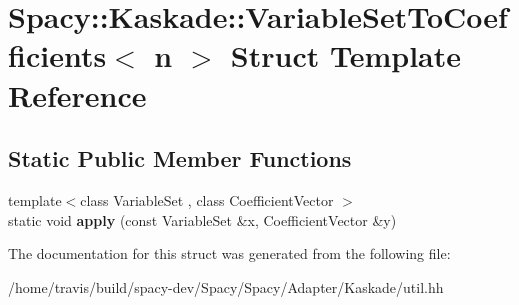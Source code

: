 \hypertarget{structSpacy_1_1Kaskade_1_1VariableSetToCoefficients}{\section{Spacy\-:\-:Kaskade\-:\-:Variable\-Set\-To\-Coefficients$<$ n $>$ Struct Template Reference}
\label{structSpacy_1_1Kaskade_1_1VariableSetToCoefficients}
}
\subsection*{Static Public Member Functions}
\begin{DoxyCompactItemize}
\item 
\hypertarget{structSpacy_1_1Kaskade_1_1VariableSetToCoefficients_a141fc5818b45f0fbeeca73a37cfff841}{{\footnotesize template$<$class Variable\-Set , class Coefficient\-Vector $>$ }\\static void {\bfseries apply} (const Variable\-Set \&x, Coefficient\-Vector \&y)}\label{structSpacy_1_1Kaskade_1_1VariableSetToCoefficients_a141fc5818b45f0fbeeca73a37cfff841}

\end{DoxyCompactItemize}


The documentation for this struct was generated from the following file\-:\begin{DoxyCompactItemize}
\item 
/home/travis/build/spacy-\/dev/\-Spacy/\-Spacy/\-Adapter/\-Kaskade/util.\-hh\end{DoxyCompactItemize}
